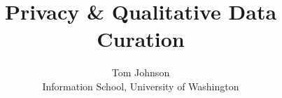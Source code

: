\documentclass [11pt]{article}
\title{Privacy \& Qualitative Data Curation}
\author{Tom Johnson\\Information School, University of Washington}
\begin{document}
\maketitle

\nocite{*}


\end{document}
